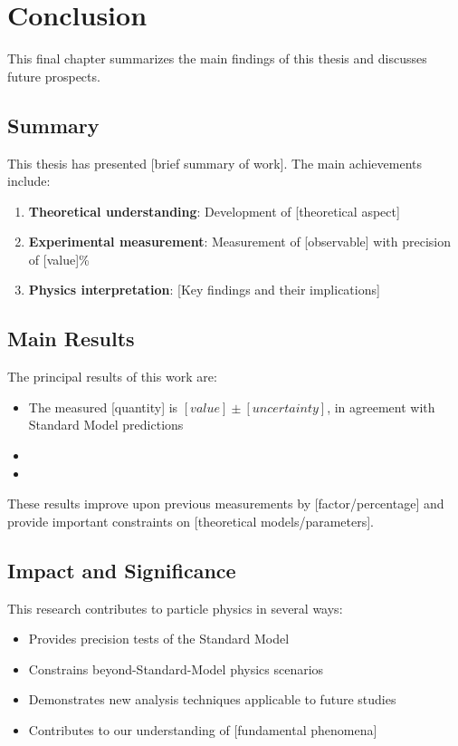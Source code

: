 \chapter{Conclusion}
\label{ch:conclusion}

This final chapter summarizes the main findings of this thesis and discusses future prospects.

\section{Summary}

This thesis has presented [brief summary of work]. The main achievements include:

\begin{enumerate}
  \item \textbf{Theoretical understanding}: Development of [theoretical aspect]
  \item \textbf{Experimental measurement}: Measurement of [observable] with precision of [value]\%
  \item \textbf{Physics interpretation}: [Key findings and their implications]
\end{enumerate}

\section{Main Results}

The principal results of this work are:
\begin{itemize}
  \item The measured [quantity] is $[value] \pm [uncertainty]$, in agreement with Standard Model predictions
  \item [Additional finding 1]
  \item [Additional finding 2]
\end{itemize}

These results improve upon previous measurements by [factor/percentage] and provide important constraints on [theoretical models/parameters].

\section{Impact and Significance}

This research contributes to particle physics in several ways:
\begin{itemize}
  \item Provides precision tests of the Standard Model
  \item Constrains beyond-Standard-Model physics scenarios
  \item Demonstrates new analysis techniques applicable to future studies
  \item Contributes to our understanding of [fundamental phenomena]
\end{itemize}

